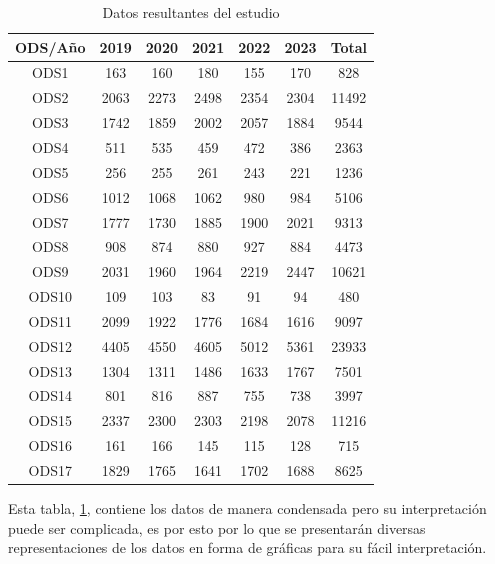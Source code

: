 \begin{table}[H]
    \begin{tabular}{|c || c | c | c | c | c | c |}
        \hline
        ODS/Año & 2019 & 2020 & 2021 & 2022 & 2023 & Total \\ \hline
                                                              \hline
        ODS1  & 163  & 160  & 180  & 155  & 170    & 828   \\ \hline
        ODS2  & 2063 & 2273 & 2498 & 2354 & 2304   & 11492 \\ \hline
        ODS3  & 1742 & 1859 & 2002 & 2057 & 1884   & 9544  \\ \hline
        ODS4  & 511  & 535  & 459  & 472  & 386    & 2363  \\ \hline
        ODS5  & 256  & 255  & 261  & 243  & 221    & 1236  \\ \hline
        ODS6  & 1012 & 1068 & 1062 & 980  & 984    & 5106  \\ \hline
        ODS7  & 1777 & 1730 & 1885 & 1900 & 2021   & 9313  \\ \hline
        ODS8  & 908  & 874  & 880  & 927  & 884    & 4473  \\ \hline
        ODS9  & 2031 & 1960 & 1964 & 2219 & 2447   & 10621 \\ \hline
        ODS10 & 109  & 103  & 83   & 91   & 94     & 480   \\ \hline
        ODS11 & 2099 & 1922 & 1776 & 1684 & 1616   & 9097  \\ \hline
        ODS12 & 4405 & 4550 & 4605 & 5012 & 5361   & 23933 \\ \hline
        ODS13 & 1304 & 1311 & 1486 & 1633 & 1767   & 7501  \\ \hline
        ODS14 & 801  & 816  & 887  & 755  & 738    & 3997  \\ \hline
        ODS15 & 2337 & 2300 & 2303 & 2198 & 2078   & 11216 \\ \hline
        ODS16 & 161  & 166  & 145  & 115  & 128    & 715   \\ \hline
        ODS17 & 1829 & 1765 & 1641 & 1702 & 1688   & 8625  \\ \hline
    \end{tabular}
    \caption{Datos resultantes del estudio}
    \label{table:Datos resultantes del estudio}
\end{table}


Esta tabla, \cref{table:Datos resultantes del estudio}, contiene los datos de
manera condensada pero su interpretación puede ser complicada, es por esto por
lo que se presentarán diversas representaciones de los datos en forma de
gráficas para su fácil interpretación.

